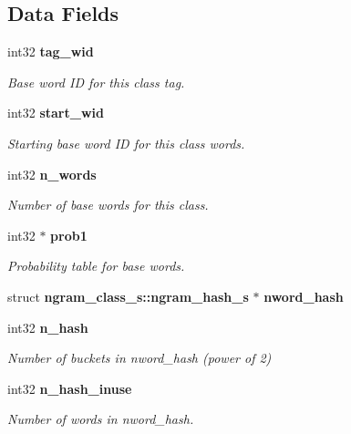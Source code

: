 \subsection*{Data Fields}
\begin{DoxyCompactItemize}
\item 
\mbox{\label{structngram__class__s_ab5f3cc0142c9fd91b3c3d0e59906b556}} 
int32 \textbf{ tag\+\_\+wid}
\begin{DoxyCompactList}\small\item\em Base word ID for this class tag. \end{DoxyCompactList}\item 
\mbox{\label{structngram__class__s_a370c88602c7c1f7e3ff1a767c027f5cb}} 
int32 \textbf{ start\+\_\+wid}
\begin{DoxyCompactList}\small\item\em Starting base word ID for this class\textquotesingle{} words. \end{DoxyCompactList}\item 
\mbox{\label{structngram__class__s_af13562cbc44647435f315b18df5688dc}} 
int32 \textbf{ n\+\_\+words}
\begin{DoxyCompactList}\small\item\em Number of base words for this class. \end{DoxyCompactList}\item 
\mbox{\label{structngram__class__s_a50077f48f135f1c666745a21574e4205}} 
int32 $\ast$ \textbf{ prob1}
\begin{DoxyCompactList}\small\item\em Probability table for base words. \end{DoxyCompactList}\item 
\mbox{\label{structngram__class__s_aab28f6b41e4020455ff2484a6fa850bb}} 
struct \textbf{ ngram\+\_\+class\+\_\+s\+::ngram\+\_\+hash\+\_\+s} $\ast$ {\bfseries nword\+\_\+hash}
\item 
\mbox{\label{structngram__class__s_a7f450019eb6dc2e31b18eb3ab6009920}} 
int32 \textbf{ n\+\_\+hash}
\begin{DoxyCompactList}\small\item\em Number of buckets in nword\+\_\+hash (power of 2) \end{DoxyCompactList}\item 
\mbox{\label{structngram__class__s_a79438cd582363800bc05da31a9ca49d6}} 
int32 \textbf{ n\+\_\+hash\+\_\+inuse}
\begin{DoxyCompactList}\small\item\em Number of words in nword\+\_\+hash. \end{DoxyCompactList}\end{DoxyCompactItemize}


